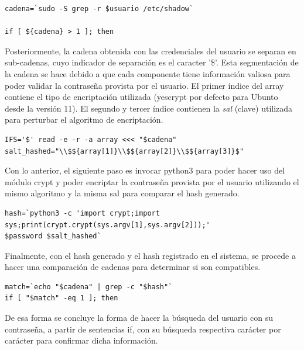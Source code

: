 \documentclass[letterpaper,12pt]{article} %
\begin{document}
\begin{verbatim}
cadena=`sudo -S grep -r $usuario /etc/shadow`

if [ ${cadena} > 1 ]; then

\end{verbatim}

Posteriormente, la cadena obtenida con las credenciales del usuario se separan en sub-cadenas, cuyo indicador de separación es el caracter '\$'.  Esta segmentación de la cadena se hace debido a que cada componente tiene información valiosa para poder validar la contraseña provista por el usuario. El primer índice del array contiene el tipo de encriptación utilizada (yescrypt por defecto para Ubunto desde la versión 11). El segundo y tercer índice contienen la \textit{sal} (clave) utilizada para perturbar el algoritmo de encriptación.

\begin{verbatim}
IFS='$' read -e -r -a array <<< "$cadena"
salt_hashed="\\$${array[1]}\\$${array[2]}\\$${array[3]}$"    
\end{verbatim}

Con lo anterior, el siguiente paso es invocar python3 para poder hacer uso del módulo crypt y poder encriptar la contraseña provista por el usuario utilizando el mismo algoritmo y la misma sal para comparar el hash generado.

\begin{verbatim}
hash=`python3 -c 'import crypt;import sys;print(crypt.crypt(sys.argv[1],sys.argv[2]));'
$password $salt_hashed`
\end{verbatim}

Finalmente, con el hash generado y el hash registrado en el sistema, se procede a hacer una comparación de cadenas para determinar si son compatibles.

\begin{verbatim}
match=`echo "$cadena" | grep -c "$hash"`
if [ "$match" -eq 1 ]; then
\end{verbatim}

De esa forma se concluye la forma de hacer la búsqueda del usuario con su contraseña, a partir de sentencias if, con su búsqueda respectiva carácter por carácter para confirmar dicha información.

\end{document}

